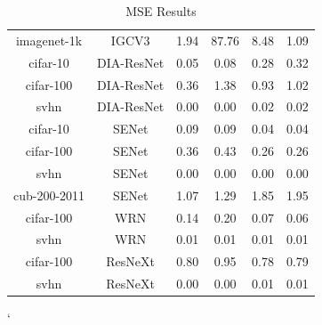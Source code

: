 \begin{table}[t]
\begin{center}
\begin{tabular}{|c|c|c|c|c|c|}
 imagenet-1k & IGCV3  & 1.94 &  87.76 & 8.48 & 1.09 \\
 cifar-10 & DIA-ResNet  & 0.05 &  0.08 & 0.28 & 0.32 \\
 cifar-100 & DIA-ResNet  & 0.36 &  1.38 & 0.93 & 1.02 \\
 svhn & DIA-ResNet  & 0.00 &  0.00 & 0.02 & 0.02 \\
 cifar-10 & SENet  & 0.09 &  0.09 & 0.04 & 0.04 \\
 cifar-100 & SENet  & 0.36 &  0.43 & 0.26 & 0.26 \\
 svhn & SENet  & 0.00 &  0.00 & 0.00 & 0.00 \\
 cub-200-2011 & SENet  & 1.07 &  1.29 & 1.85 & 1.95 \\
 cifar-100 & WRN  & 0.14 &  0.20 & 0.07 & 0.06 \\
 svhn & WRN  & 0.01 &  0.01 & 0.01 & 0.01 \\
 cifar-100 & ResNeXt  & 0.80 &  0.95 & 0.78 & 0.79 \\
 svhn & ResNeXt  & 0.00 &  0.00 & 0.01 & 0.01 \\
\hline
\end{tabular}
\end{center}
\caption{MSE Results}
\label{table:MSEresults}
\end{table}`


